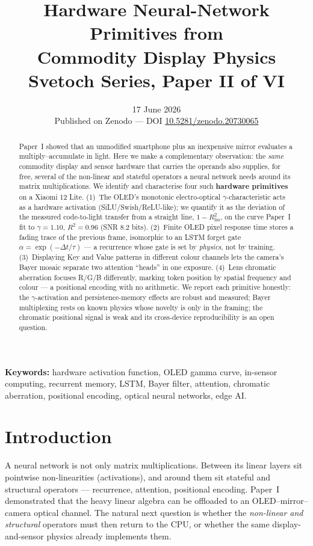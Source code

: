\documentclass[11pt]{article}
\title{\textbf{Hardware Neural-Network Primitives from\\ Commodity Display Physics}\\[4pt]
{\large Svetoch Series, Paper II of VI}}
\author{\svetochauthor}
\date{17 June 2026\\[2pt]{\normalsize Published on Zenodo --- DOI \href{https://doi.org/10.5281/zenodo.20730065}{10.5281/zenodo.20730065}}}
\begin{document}
\maketitle

\begin{abstract}
\noindent Paper~I showed that an unmodified smartphone plus an inexpensive mirror evaluates a
multiply--accumulate in light. Here we make a complementary observation: the \emph{same}
commodity display and sensor hardware that carries the operands also supplies, for free,
several of the non-linear and stateful operators a neural network needs around its matrix
multiplications. We identify and characterise four such \textbf{hardware primitives} on a
Xiaomi 12 Lite. (1)~The OLED's monotonic electro-optical $\gamma$-characteristic acts as a
hardware activation (SiLU/Swish/ReLU-like); we quantify it as the deviation of the measured
code-to-light transfer from a straight line, $1-R^2_\text{lin}$, on the curve Paper~I fit to
$\gamma=1.10$, $R^2=0.96$ (SNR $8.2$ bits). (2)~Finite OLED pixel response time stores a
fading trace of the previous frame, isomorphic to an LSTM forget gate
$\alpha=\exp(-\Delta t/\tau)$ --- a recurrence whose gate is set by \emph{physics}, not by
training. (3)~Displaying Key and Value patterns in different colour channels lets the camera's
Bayer mosaic separate two attention ``heads'' in one exposure. (4)~Lens chromatic aberration
focuses R/G/B differently, marking token position by spatial frequency and colour --- a
positional encoding with no arithmetic. We report each primitive honestly: the
$\gamma$-activation and persistence-memory effects are robust and measured; Bayer multiplexing
rests on known physics whose novelty is only in the framing; the chromatic positional signal
is weak and its cross-device reproducibility is an open question.
\end{abstract}

\noindent\textbf{Keywords:} hardware activation function, OLED gamma curve, in-sensor
computing, recurrent memory, LSTM, Bayer filter, attention, chromatic aberration, positional
encoding, optical neural networks, edge AI.

\section{Introduction}
A neural network is not only matrix multiplications. Between its linear layers sit pointwise
non-linearities (activations), and around them sit stateful and structural operators ---
recurrence, attention, positional encoding. Paper~I demonstrated that the heavy linear algebra
can be offloaded to an OLED--mirror--camera optical channel. The natural next question is
whether the \emph{non-linear and structural} operators must then return to the CPU, or whether
the same display-and-sensor physics already implements them.
\end{document}
